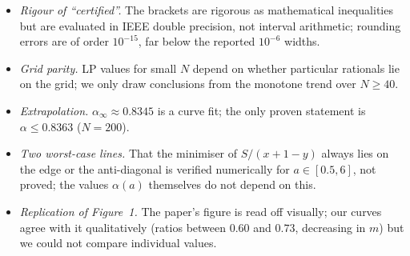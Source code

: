 \documentclass{article}
\begin{document}
\begin{itemize}
\item \emph{Rigour of ``certified''.} The brackets are rigorous as mathematical inequalities but
  are evaluated in IEEE double precision, not interval arithmetic; rounding errors are of order
  $10^{-15}$, far below the reported $10^{-6}$ widths.
\item \emph{Grid parity.} LP values for small $N$ depend on whether particular rationals lie on
  the grid; we only draw conclusions from the monotone trend over $N\ge40$.
\item \emph{Extrapolation.} $\alpha_\infty\approx0.8345$ is a curve fit; the only proven
  statement is $\alpha\le0.8363$ ($N=200$).
\item \emph{Two worst-case lines.} That the minimiser of $S/(x+1-y)$ always lies on the edge or
  the anti-diagonal is verified numerically for $a\in[0.5,6]$, not proved; the values
  $\alpha(a)$ themselves do not depend on this.
\item \emph{Replication of Figure~1.} The paper's figure is read off visually; our curves agree
  with it qualitatively (ratios between $0.60$ and $0.73$, decreasing in $m$) but we could not
  compare individual values.
\end{itemize}





\end{document}
